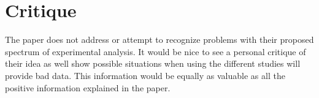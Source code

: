 \documentclass{article}
\begin{document}
\section*{Critique}
The paper does not address or attempt to recognize problems with their proposed spectrum of experimental analysis. It would be nice to see a personal critique of their idea as well show possible situations when using the different studies will provide bad data. This information would be equally as valuable as all the positive information explained in the paper.	
\cite{Steinfeld_2009_6322}
\end{document}
